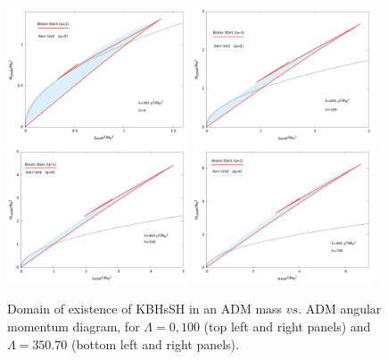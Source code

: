 \begin{figure}[h!]
  \begin{center}
    \includegraphics[width=0.48\textwidth]{papers/selfInteractions/c2=0-J-M.png}
    \includegraphics[width=0.48\textwidth]{papers/selfInteractions/c2=100-J-M.png}\\
    \includegraphics[width=0.48\textwidth]{papers/selfInteractions/c2=350-J-M.png}
    \includegraphics[width=0.48\textwidth]{papers/selfInteractions/c2=750-J-M.png}
  \end{center}
  \caption{Domain of existence of KBHsSH in an ADM mass $vs.$ ADM angular momentum diagram, for $\Lambda=0,100$ (top left and right panels) and $\Lambda=350.70$ (bottom left and right panels).}
  \label{fig:no-HBHs}
\end{figure}
 


